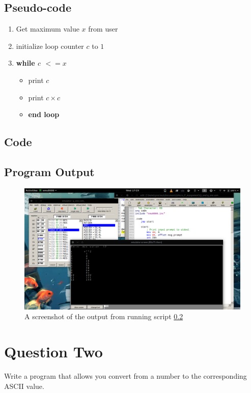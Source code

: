 \documentclass[]{article}
\begin{document}
\subsection{Pseudo-code}
\begin{enumerate}
	\item Get maximum value $x$ from user
	\item initialize loop counter $c$ to $1$
	\item \textbf{while $c $ $<= x$ }
	\begin{itemize}
		\item print $c$
		\item print $c \times c$
		\item \textbf{end loop}
	\end{itemize}
\end{enumerate}

\subsection{Code} \label{script 1}


\clearpage
\subsection{Program Output}

\begin{figure}[h]
	\includegraphics[width=15cm]{Q_one/q1_updated_aug26.png}
	\centering
	\caption{A screenshot of the output from running script \ref{script 1}}
\end{figure}



\newpage
\clearpage
\section{Question Two}
Write a program that allows you convert from a number to the corresponding ASCII value.
\end{document}
